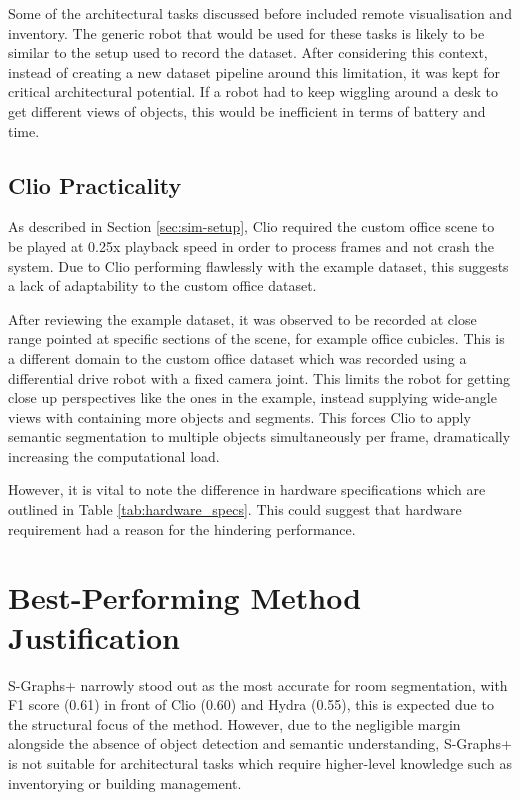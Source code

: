 Some of the architectural tasks discussed before included remote visualisation and inventory. The generic robot that would be used for these tasks is likely to be similar to the setup used to record the dataset. After considering this context, instead of creating a new dataset pipeline around this limitation, it was kept for critical architectural potential. If a robot had to keep wiggling around a desk to get different views of objects, this would be inefficient in terms of battery and time.

\subsection{Clio Practicality}\label{sec:disc-clio-practicality}

As described in Section \ref{sec:sim-setup}, Clio required the custom office scene to be played at 0.25x playback speed in order to process frames and not crash the system. Due to Clio performing flawlessly with the example dataset, this suggests a lack of adaptability to the custom office dataset. 

After reviewing the example dataset, it was observed to be recorded at close range pointed at specific sections of the scene, for example office cubicles. This is a different domain to the custom office dataset which was recorded using a differential drive robot with a fixed camera joint. This limits the robot for getting close up perspectives like the ones in the example, instead supplying wide-angle views with containing more objects and segments. This forces Clio to apply semantic segmentation to multiple objects simultaneously per frame, dramatically increasing the computational load.

However, it is vital to note the difference in hardware specifications which are outlined in Table \ref{tab:hardware_specs}. This could suggest that hardware requirement had a reason for the hindering performance.


\section{Best-Performing Method Justification}\label{sec:res:best-method}

S-Graphs+ narrowly stood out as the most accurate for room segmentation, with F1 score (0.61) in front of Clio (0.60) and Hydra (0.55), this is expected due to the structural focus of the method. However, due to the negligible margin alongside the absence of object detection and semantic understanding, S-Graphs+ is not suitable for architectural tasks which require higher-level knowledge such as inventorying or building management.

